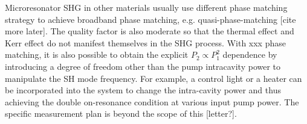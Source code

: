 \documentclass[a4paper,8pt,hyperref, twocolumn]{article}
\begin{document}
Microresonator SHG in other materials usually use different phase matching strategy to achieve broadband phase matching, e.g. quasi-phase-matching [cite more later]. The quality factor is also moderate so that the thermal effect and Kerr effect do not manifest themselves in the SHG process. 
With xxx phase matching, it is also possible to obtain the explicit $P_2 \propto P_1^2$ dependence by introducing a degree of freedom other than the pump intracavity power to manipulate the SH mode frequency. 
For example, a control light or a heater can be incorporated into the system to change the intra-cavity power and thus achieving the double on-resonance condition at various input pump power. 
The specific measurement plan is beyond the scope of this [letter?].%






\end{document}
